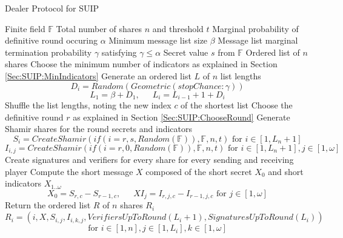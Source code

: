 \documentclass{dalcsthesis}
\begin{document}
\begin{algorithm}
  \caption{Dealer Protocol for SUIP}
  \label{alg:SUIP:Dealer}
  \begin{algorithmic}[1]
    \INPUT Finite field $\mathbb{F}$
    \INPUT Total number of shares $n$ and threshold $t$
    \INPUT Marginal probability of definitive round occuring $\alpha$
    \INPUT Minimum message list size $\beta$
    \INPUT Message list marginal termination probability $\gamma$ satisfying $\gamma \leq \alpha$
    \INPUT Secret value $s$ from $\mathbb{F}$
    \OUTPUT Ordered list of $n$ shares
    \STATE Choose the minimum number of indicators as explained in Section \ref{Sec:SUIP:MinIndicators}
    \STATE Generate an ordered list $L$ of $n$ list lengths
    	$$D_i = Random(Geometric(stopChance: \gamma))$$
    	$$L_1 = \beta + D_1 \text{, } \text{ } \text{ } L_i = L_{i-1} + 1 + D_i$$
    \STATE Shuffle the list lengths, noting the new index $c$ of the shortest list
    \STATE Choose the definitive round $r$ as explained in Section \ref{Sec:SUIP:ChooseRound}
    \STATE Generate Shamir shares for the round secrets and indicators
    	$$S_{i} = CreateShamir(if(i = r, s, Random(\mathbb{F})), \mathbb{F}, n, t) \text{ for } i \in [1, L_n+1]$$
    	$$I_{i,j} = CreateShamir(if(i = r, 0, Random(\mathbb{F})), \mathbb{F}, n, t) \text{ for } i \in [1, L_n+1], j \in [1, \omega]$$
    \STATE Create signatures and verifiers for every share for every sending and receiving player
    \STATE Compute the short message $X$ composed of the short secret $X_0$ and short indicators $X_{1..\omega}$
    	$$X_0 = S_{r,c} - S_{r-1,c} \text{, } \text{ } \text{ } XI_j = I_{r,j,c} - I_{r-1,j,c} \text{ for } j \in [1, \omega]$$
    \STATE Return the ordered list $R$ of $n$ shares $R_i$
    	$$R_i = (i, X, S_{i,j}, I_{i,k,j}, VerifiersUpToRound(L_i+1), SignaturesUpToRound(L_i))$$
    	$$\text{for } i \in [1, n], j \in [1, L_i], k \in [1, \omega]$$
  \end{algorithmic}
\end{algorithm}
\end{document}
